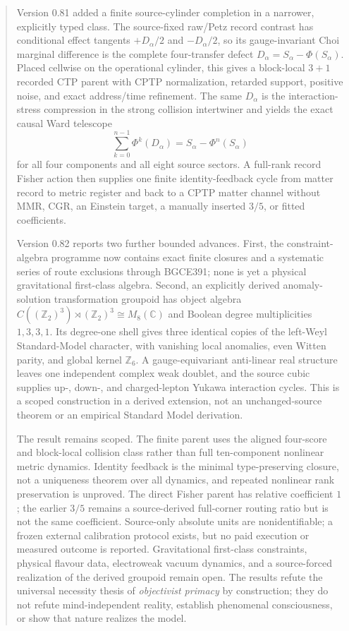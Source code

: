 \documentclass[11pt]{article}
\theoremstyle{definition}
\theoremstyle{remark}
\begin{document}
\begin{abstract}
Version 0.81 added a finite source-cylinder completion in a narrower, explicitly typed class. The source-fixed raw/Petz record contrast has conditional effect tangents $+D_\alpha/2$ and $-D_\alpha/2$, so its gauge-invariant Choi marginal difference is the complete four-transfer defect $D_\alpha=S_\alpha-\Phi(S_\alpha)$. Placed cellwise on the operational cylinder, this gives a block-local $3+1$ recorded CTP parent with CPTP normalization, retarded support, positive noise, and exact address/time refinement. The same $D_\alpha$ is the interaction-stress compression in the strong collision intertwiner and yields the exact causal Ward telescope
\[
\sum_{k=0}^{n-1}\Phi^k(D_\alpha)=S_\alpha-\Phi^n(S_\alpha)
\]
for all four components and all eight source sectors. A full-rank record Fisher action then supplies one finite identity-feedback cycle from matter record to metric register and back to a CPTP matter channel without MMR, CGR, an Einstein target, a manually inserted $3/5$, or fitted coefficients.

Version 0.82 reports two further bounded advances. First, the constraint-algebra programme now contains exact finite closures and a systematic series of route exclusions through BGCE391; none is yet a physical gravitational first-class algebra. Second, an explicitly derived anomaly-solution transformation groupoid has object algebra $C((\mathbb Z_2)^3)\rtimes(\mathbb Z_2)^3\cong M_8(\mathbb C)$ and Boolean degree multiplicities $1,3,3,1$. Its degree-one shell gives three identical copies of the left-Weyl Standard-Model character, with vanishing local anomalies, even Witten parity, and global kernel $\mathbb Z_6$. A gauge-equivariant anti-linear real structure leaves one independent complex weak doublet, and the source cubic supplies up-, down-, and charged-lepton Yukawa interaction cycles. This is a scoped construction in a derived extension, not an unchanged-source theorem or an empirical Standard Model derivation.

The result remains scoped. The finite parent uses the aligned four-score and block-local collision class rather than full ten-component nonlinear metric dynamics. Identity feedback is the minimal type-preserving closure, not a uniqueness theorem over all dynamics, and repeated nonlinear rank preservation is unproved. The direct Fisher parent has relative coefficient $1$; the earlier $3/5$ remains a source-derived full-corner routing ratio but is not the same coefficient. Source-only absolute units are nonidentifiable; a frozen external calibration protocol exists, but no paid execution or measured outcome is reported. Gravitational first-class constraints, physical flavour data, electroweak vacuum dynamics, and a source-forced realization of the derived groupoid remain open. The results refute the universal necessity thesis of \emph{objectivist primacy} by construction; they do not refute mind-independent reality, establish phenomenal consciousness, or show that nature realizes the model.
\end{abstract}
\end{document}
